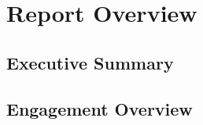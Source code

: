\documentclass[12pt, table,dvipsnames]{article}
\begin{document}
\section{Report Overview}
\subsection{Executive Summary}

\newpage

\subsection{Engagement Overview}
\lipsum[2-4]

\end{document}
